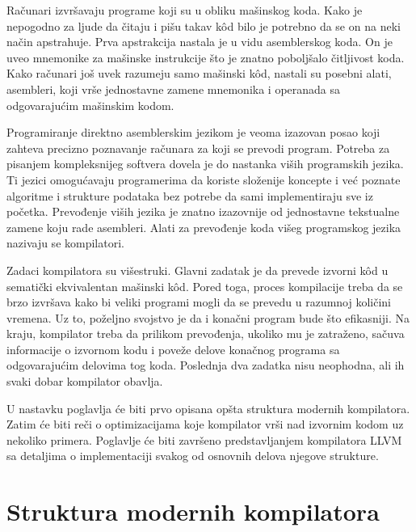 \documentclass[12pt,oneside]{memoir}
\begin{document}
Računari izvršavaju programe koji su u obliku mašinskog koda.
Kako je nepogodno za ljude da čitaju i pišu takav k\^od bilo je potrebno da se on na neki način apstrahuje.
Prva apstrakcija nastala je u vidu asemblerskog koda.
On je uveo mnemonike za mašinske instrukcije što je znatno poboljšalo čitljivost koda.
Kako računari još uvek razumeju samo mašinski k\^od, nastali su posebni alati, asembleri, koji vrše jednostavne zamene mnemonika i operanada sa odgovarajućim mašinskim kodom.

Programiranje direktno asemblerskim jezikom je veoma izazovan posao koji zahteva precizno poznavanje računara za koji se prevodi program.
Potreba za pisanjem kompleksnijeg softvera dovela je do nastanka viših programskih jezika.
Ti jezici omogućavaju programerima da koriste složenije koncepte i već poznate algoritme i strukture podataka bez potrebe da sami implementiraju sve iz početka.
Prevođenje viših jezika je znatno izazovnije od jednostavne tekstualne zamene koju rade asembleri.
Alati za prevođenje koda višeg programskog jezika nazivaju se kompilatori.


Zadaci kompilatora su višestruki.
Glavni zadatak je da prevede izvorni k\^od u sematički ekvivalentan mašinski k\^od.
Pored toga, proces kompilacije treba da se brzo izvršava kako bi veliki programi mogli da se prevedu u razumnoj količini vremena.
Uz to, poželjno svojstvo je da i konačni program bude što efikasniji.
Na kraju, kompilator treba da prilikom prevođenja, ukoliko mu je zatraženo, sačuva informacije o izvornom kodu i poveže delove konačnog programa sa odgovarajućim delovima tog koda.
Poslednja dva zadatka nisu neophodna, ali ih svaki dobar kompilator obavlja.

U nastavku poglavlja će biti prvo opisana opšta struktura modernih kompilatora.
Zatim će biti reči o optimizacijama koje kompilator vrši nad izvornim kodom uz nekoliko primera.
Poglavlje će biti završeno predstavljanjem kompilatora LLVM sa detaljima o implementaciji svakog od osnovnih delova njegove strukture.


\section{Struktura modernih kompilatora}
\label{sec:compiler_structure}

\end{document}

